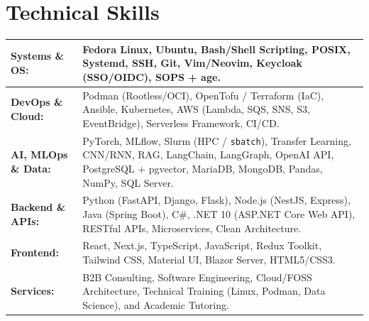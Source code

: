\section{Technical Skills}
\begin{tabular}{@{}p{3.8cm}>{\raggedright\arraybackslash}p{12.2cm}@{}}
  \textbf{Systems \& OS:}   & Fedora Linux, Ubuntu, Bash/Shell Scripting, POSIX, Systemd, SSH, Git, Vim/Neovim, Keycloak (SSO/OIDC), SOPS + age. \\
  \midrule
  \textbf{DevOps \& Cloud:} & Podman (Rootless/OCI), OpenTofu / Terraform (IaC), Ansible, Kubernetes, AWS (Lambda, SQS, SNS, S3, EventBridge), Serverless Framework, CI/CD. \\
  \midrule
  \textbf{AI, MLOps \& Data:} & PyTorch, MLflow, Slurm (HPC / \texttt{sbatch}), Transfer Learning, CNN/RNN, RAG, LangChain, LangGraph, OpenAI API, PostgreSQL + pgvector, MariaDB, MongoDB, Pandas, NumPy, SQL Server. \\
  \midrule
  \textbf{Backend \& APIs:} & Python (FastAPI, Django, Flask), Node.js (NestJS, Express), Java (Spring Boot), C\#, .NET 10 (ASP.NET Core Web API), RESTful APIs, Microservices, Clean Architecture. \\
  \midrule
  \textbf{Frontend:}         & React, Next.js, TypeScript, JavaScript, Redux Toolkit, Tailwind CSS, Material UI, Blazor Server, HTML5/CSS3. \\
  \midrule
  \textbf{Services:}        & B2B Consulting, Software Engineering, Cloud/FOSS Architecture, Technical Training (Linux, Podman, Data Science), and Academic Tutoring. \\
\end{tabular}
